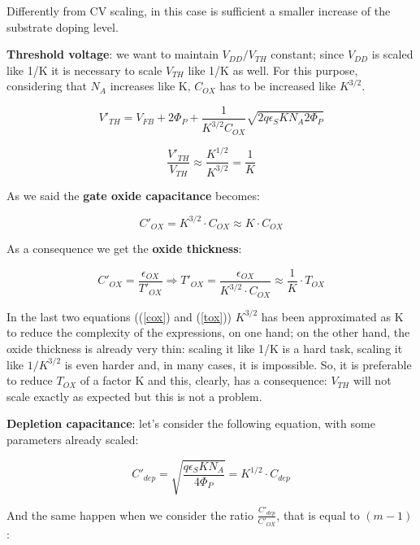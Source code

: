 \documentclass[a4paper, 12pt, twoside, openright]{report}
\begin{document}
\begin{enumerate}
Differently from CV scaling, in this case is sufficient a smaller increase of the substrate doping level.

\textbf{Threshold voltage}: we want to maintain $V_{DD}/V_{TH}$ constant; since $V_{DD}$ is scaled like 1/K it is necessary to scale $V_{TH}$ like 1/K as well. For this purpose, considering that $N_{A}$ increases like K, $C_{OX}$ has to be increased like $K^{3/2}$.

	\begin{equation}
	V'_{TH} = V_{FB} + 2\Phi_P + \frac{1}{K^{3/2} C_{OX}} \sqrt{2q \epsilon_S K N_A 2\Phi_P}
	\end{equation}
	
	\begin{equation}
	\frac{V'_{TH}}{V_{TH}} \approx \frac{K^{1/2}} {K^{3/2}} = \frac{1}{K}
	\end{equation}

As we said the \textbf{gate oxide capacitance} becomes:

	\begin{equation}
	C'_{OX} = K^{3/2} \cdot C_{OX}  \approx K \cdot C_{OX}
	\label{cox}
	\end{equation}

As a consequence we get the \textbf{oxide thickness}:

	\begin{equation}
	C'_{OX} = \frac{\epsilon_{OX}}{T'_{OX}} \Rightarrow T'_{OX} = \frac{\epsilon_{OX}}{K^{3/2} \cdot C_{OX}} \approx \frac{1}{K} \cdot T_{OX}
	\label{tox}
	\end{equation}

In the last two equations ((\ref{cox}) and (\ref{tox})) $K^{3/2}$ has been approximated as K to reduce the complexity of the expressions, on one hand; on the other hand, the oxide thickness is already very thin: scaling it like 1/K is a hard task, scaling it like $1/K^{3/2}$ is even harder and, in many cases, it is impossible. So, it is preferable to reduce $T_{OX}$ of a factor K and this, clearly, has a consequence: $V_{TH}$ will not scale exactly as expected but this is not a problem.

\textbf{Depletion capacitance}: let's consider the following equation, with some parameters already scaled:

	\begin{equation}
	C'_{dep} = \sqrt{\frac{q \epsilon_S K N_A}{4 \Phi_P}} = K^{1/2} \cdot C_{dep} 
	\label{}
	\end{equation}

And the same happen when we consider the ratio $\frac{C'_{dep}}{C'_{OX}}$, that is equal to $(m - 1)$:


\end{enumerate}
\end{document}
